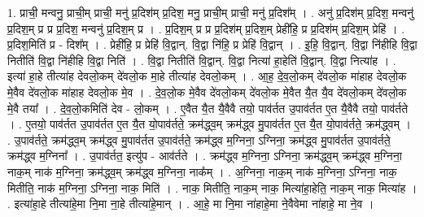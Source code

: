\documentclass[17pt]{extarticle}
\begin{document}
1. प्राची॒ मन्वनु॒ प्राची॒म् प्राची॒ मनु॑ प्र॒दिश॑म् प्र॒दिश॒ मनु॒ प्राची॒म् प्राची॒ मनु॑ प्र॒दिश᳚म् । . अनु॑ प्र॒दिश॑म् प्र॒दिश॒ मन्वनु॑ प्र॒दिश॒म् प्र प्र प्र॒दिश॒ मन्वनु॑ प्र॒दिश॒म् प्र । . प्र॒दिश॒म् प्र प्र प्र॒दिश॑म् प्र॒दिश॒म् प्रेही॑हि॒ प्र प्र॒दिश॑म् प्र॒दिश॒म् प्रेहि॑ । . प्र॒दिश॒मिति॑ प्र - दिश᳚म् । . प्रेही॑हि॒ प्र प्रेहि॑ वि॒द्वान्. वि॒द्वा नि॑हि॒ प्र प्रेहि॑ वि॒द्वान् । . इ॒हि॒ वि॒द्वान्. वि॒द्वा नि॑हीहि वि॒द्वा नितीति॑ वि॒द्वा नि॑हीहि वि॒द्वा निति॑ । . वि॒द्वा नितीति॑ वि॒द्वान्. वि॒द्वा नित्या॑ हा॒हेति॑ वि॒द्वान्. वि॒द्वा नित्या॑ह । . इत्या॑ हा॒हे तीत्या॑ह देवलो॒कम् दे॑वलो॒क मा॒हे तीत्या॑ह देवलो॒कम् । . आ॒ह॒ दे॒व॒लो॒कम् दे॑वलो॒क मा॑हाह देवलो॒क मे॒वैव दे॑वलो॒क मा॑हाह देवलो॒क मे॒व । . दे॒व॒लो॒क मे॒वैव दे॑वलो॒कम् दे॑वलो॒क मे॒वैत यै॒त यै॒व दे॑वलो॒कम् दे॑वलो॒क मे॒वै तया᳚ । . दे॒व॒लो॒कमिति॑ देव - लो॒कम् । . ए॒वैत यै॒त यै॒वैवै तयो॒ पाव॑र्तत उ॒पाव॑र्तत ए॒त यै॒वैवै तयो॒ पाव॑र्तते । . ए॒तयो॒ पाव॑र्तत उ॒पाव॑र्तत ए॒त यै॒त यो॒पाव॑र्तते॒ क्रम॑द्ध्व॒म् क्रम॑द्ध्व मु॒पाव॑र्तत ए॒त यै॒त
यो॒पाव॑र्तते॒ क्रम॑द्ध्वम् । . उ॒पाव॑र्तते॒ क्रम॑द्ध्व॒म् क्रम॑द्ध्व मु॒पाव॑र्तत उ॒पाव॑र्तते॒ क्रम॑द्ध्व म॒ग्निना॒ ऽग्निना॒ क्रम॑द्ध्व मु॒पाव॑र्तत उ॒पाव॑र्तते॒ क्रम॑द्ध्व म॒ग्निना᳚ । . उ॒पाव॑र्तत॒ इत्यु॑प - आव॑र्तते । . क्रम॑द्ध्व म॒ग्निना॒ ऽग्निना॒ क्रम॑द्ध्व॒म् क्रम॑द्ध्व म॒ग्निना॒ नाक॒म् नाक॑ म॒ग्निना॒ क्रम॑द्ध्व॒म् क्रम॑द्ध्व म॒ग्निना॒ नाक᳚म् । . अ॒ग्निना॒ नाक॒म् नाक॑ म॒ग्निना॒ ऽग्निना॒ नाक॒ मितीति॒ नाक॑ म॒ग्निना॒ ऽग्निना॒ नाक॒ मिति॑ । . नाक॒ मितीति॒ नाक॒म् नाक॒ मित्या॑हा॒हेति॒ नाक॒म् नाक॒ मित्या॑ह । . इत्या॑हा॒हे तीत्या॑हे॒मा नि॒मा ना॒हे तीत्या॑हे॒मान् । . आ॒हे॒ मा नि॒मा ना॑हाहे॒मा ने॒वैवेमा ना॑हाहे॒ मा ने॒व । \newline
\end{document}
